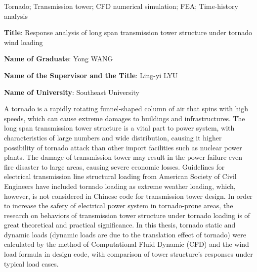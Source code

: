 \begin{abstract}{龙卷风；大跨越输电塔结构；CFD数值模拟；有限元分析；动力时程分析}
  最后，进行了输电塔结构在考虑龙卷风平移效应时的动态响应分析。
  选取龙卷风移动路径平行和垂直于输电线的两种典型工况，在任意时间步利用规范方法计算并施加龙卷风动态荷载，进行动力时程分析，并分析龙卷风动态荷载和结构典型响应的时程。
  结果表明，平行工况下龙卷风荷载总和时程沿输电线方向的分量出现持续时间约为\SI{10}{s}的波形（荷载先逐渐增大，后逐渐衰减），且荷载峰值较大，呈现出一定的冲击效应。
  垂直工况下龙卷风荷载总和时程沿垂直输电线方向的分量呈现类似的特点。
  且在两种工况下，输电塔塔顶节点位移时程与龙卷风荷载总和时程变化趋势相似。
  
\end{abstract}

\begin{englishabstract}{Tornado; Transmission tower; CFD numerical simulation; FEA; Time-history analysis }

  
  \noindent
  {\textbf {Title}: } Response analysis of long span transmission tower structure under tornado wind loading \par
  \noindent
  {\textbf {Name of Graduate}: } Yong WANG\par
  \noindent
  {\textbf {Name of the Supervisor and the Title}: } Ling-yi LYU \par
  \noindent
  {\textbf {Name of University}: } Southeast University \par
  
  \bigskip
  

  A tornado is a rapidly rotating funnel-shaped column of air that spins with high speeds, which can cause extreme damages to buildings and infrastructures.
  The long span transmission tower structure is a vital part to power system, with characteristics of large numbers and wide distribution, causing it higher possibility of tornado attack than other import facilities such as nuclear power plants.
  The damage of transmission tower may result in the power failure even fire disaster to large areas, causing severe economic losses.
  Guidelines for electrical transmission line structural loading from American Society of Civil Engineers have included tornado loading as extreme weather loading, which, however, is not considered in Chinese code for transmission tower design.
  In order to increase the safety of electrical power system in tornado-prone areas, the research on behaviors of transmission tower structure under tornado loading is of great theoretical and practical significance.
  In this thesis, tornado static and dynamic loads (dynamic loads are due to the translation effect of tornado) were calculated by the method of Computational Fluid Dynamic (CFD) and the wind load formula in design code, with comparison of tower structure's responses under typical load cases.


\end{englishabstract}
